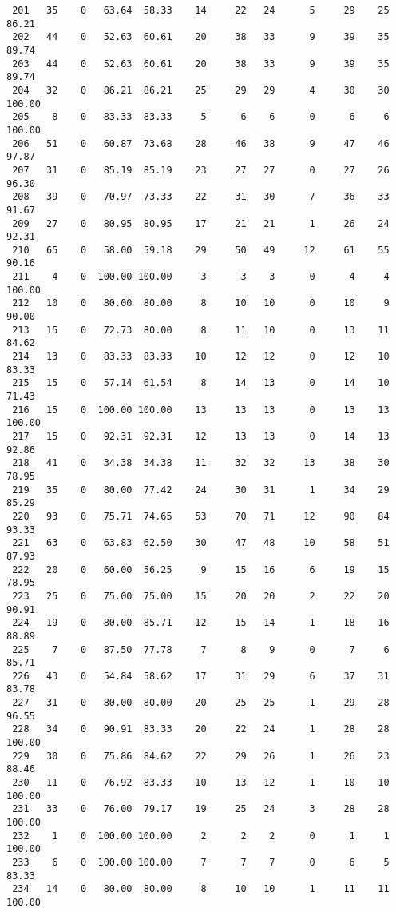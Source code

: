 \begin{verbatim}
 201   35    0   63.64  58.33    14     22   24      5     29    25    86.21
 202   44    0   52.63  60.61    20     38   33      9     39    35    89.74
 203   44    0   52.63  60.61    20     38   33      9     39    35    89.74
 204   32    0   86.21  86.21    25     29   29      4     30    30   100.00
 205    8    0   83.33  83.33     5      6    6      0      6     6   100.00
 206   51    0   60.87  73.68    28     46   38      9     47    46    97.87
 207   31    0   85.19  85.19    23     27   27      0     27    26    96.30
 208   39    0   70.97  73.33    22     31   30      7     36    33    91.67
 209   27    0   80.95  80.95    17     21   21      1     26    24    92.31
 210   65    0   58.00  59.18    29     50   49     12     61    55    90.16
 211    4    0  100.00 100.00     3      3    3      0      4     4   100.00
 212   10    0   80.00  80.00     8     10   10      0     10     9    90.00
 213   15    0   72.73  80.00     8     11   10      0     13    11    84.62
 214   13    0   83.33  83.33    10     12   12      0     12    10    83.33
 215   15    0   57.14  61.54     8     14   13      0     14    10    71.43
 216   15    0  100.00 100.00    13     13   13      0     13    13   100.00
 217   15    0   92.31  92.31    12     13   13      0     14    13    92.86
 218   41    0   34.38  34.38    11     32   32     13     38    30    78.95
 219   35    0   80.00  77.42    24     30   31      1     34    29    85.29
 220   93    0   75.71  74.65    53     70   71     12     90    84    93.33
 221   63    0   63.83  62.50    30     47   48     10     58    51    87.93
 222   20    0   60.00  56.25     9     15   16      6     19    15    78.95
 223   25    0   75.00  75.00    15     20   20      2     22    20    90.91
 224   19    0   80.00  85.71    12     15   14      1     18    16    88.89
 225    7    0   87.50  77.78     7      8    9      0      7     6    85.71
 226   43    0   54.84  58.62    17     31   29      6     37    31    83.78
 227   31    0   80.00  80.00    20     25   25      1     29    28    96.55
 228   34    0   90.91  83.33    20     22   24      1     28    28   100.00
 229   30    0   75.86  84.62    22     29   26      1     26    23    88.46
 230   11    0   76.92  83.33    10     13   12      1     10    10   100.00
 231   33    0   76.00  79.17    19     25   24      3     28    28   100.00
 232    1    0  100.00 100.00     2      2    2      0      1     1   100.00
 233    6    0  100.00 100.00     7      7    7      0      6     5    83.33
 234   14    0   80.00  80.00     8     10   10      1     11    11   100.00

\end{verbatim}
